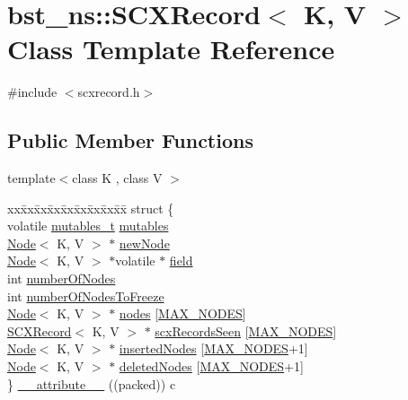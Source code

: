 \hypertarget{classbst__ns_1_1SCXRecord}{}\section{bst\+\_\+ns\+:\+:S\+C\+X\+Record$<$ K, V $>$ Class Template Reference}
\label{classbst__ns_1_1SCXRecord}


{\ttfamily \#include $<$scxrecord.\+h$>$}

\subsection*{Public Member Functions}
\begin{DoxyCompactItemize}
\item 
template$<$class K , class V $>$ \begin{tabbing}
xx\=xx\=xx\=xx\=xx\=xx\=xx\=xx\=xx\=\kill
struct \{\\
\>volatile \hyperlink{descriptors_8h_a8a5af2749482b19d7515054489efca22}{mutables\_t} \hyperlink{classbst__ns_1_1SCXRecord_ad707acfc8bceec490ba56fa95d4b5352}{mutables}\\
\>\hyperlink{classbst__ns_1_1Node}{Node}$<$ K, V $>$ $\ast$ \hyperlink{classbst__ns_1_1SCXRecord_adb045921444e7bc3c1dc3c3581752289}{newNode}\\
\>\hyperlink{classbst__ns_1_1Node}{Node}$<$ K, V $>$ $\ast$volatile $\ast$ \hyperlink{classbst__ns_1_1SCXRecord_a539ffffd648f59666ebab5bc1cae180f}{field}\\
\>int \hyperlink{classbst__ns_1_1SCXRecord_acf9f5e7aa42c757fa9ed66f19052d06f}{numberOfNodes}\\
\>int \hyperlink{classbst__ns_1_1SCXRecord_a68ee06be0281625a027f71fae2786643}{numberOfNodesToFreeze}\\
\>\hyperlink{classbst__ns_1_1Node}{Node}$<$ K, V $>$ $\ast$ \hyperlink{classbst__ns_1_1SCXRecord_a91ee309565cb07b7eca41b7aa9a26d39}{nodes} \mbox{[}\hyperlink{scxrecord_8h_abd2aacdca9cb2a1a30f3392256b96ea3}{MAX\_NODES}\mbox{]}\\
\>\hyperlink{classbst__ns_1_1SCXRecord}{SCXRecord}$<$ K, V $>$ $\ast$ \hyperlink{classbst__ns_1_1SCXRecord_ae3cd3a3c2108475b0929db86ee8f2887}{scxRecordsSeen} \mbox{[}\hyperlink{scxrecord_8h_abd2aacdca9cb2a1a30f3392256b96ea3}{MAX\_NODES}\mbox{]}\\
\>\hyperlink{classbst__ns_1_1Node}{Node}$<$ K, V $>$ $\ast$ \hyperlink{classbst__ns_1_1SCXRecord_ad168d1132cbd02e63917cb601faa082f}{insertedNodes} \mbox{[}\hyperlink{scxrecord_8h_abd2aacdca9cb2a1a30f3392256b96ea3}{MAX\_NODES}+1\mbox{]}\\
\>\hyperlink{classbst__ns_1_1Node}{Node}$<$ K, V $>$ $\ast$ \hyperlink{classbst__ns_1_1SCXRecord_a58674d554b988380986ffac69a7e2103}{deletedNodes} \mbox{[}\hyperlink{scxrecord_8h_abd2aacdca9cb2a1a30f3392256b96ea3}{MAX\_NODES}+1\mbox{]}\\
\} \hyperlink{classbst__ns_1_1SCXRecord_aba7f726f71e45d8972a309cdf0dc265e}{\_\_attribute\_\_} ((packed)) c\\


\end{tabbing}
\end{DoxyCompactItemize}
